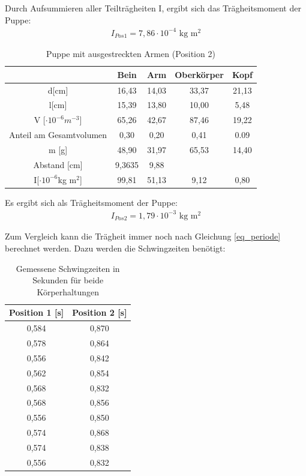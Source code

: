 Durch Aufsummieren aller Teilträgheiten I, ergibt sich das Trägheitsmoment der Puppe:
\begin{align*}
I_{Pos 1}= 7,86
\cdot 10^{-4}\text{ kg m$^2$}
\end{align*}

\begin{table}[H]
\begin{tabular}{|c|c|c|c|c|}
\hline 		
&	Bein&	Arm	&Oberkörper	&Kopf	\\ \hline	
d[cm]&	16,43	&14,03&	33,37&	21,13		\\ \hline		
l[cm]&	15,39&	13,80&	10,00	&5,48\\ \hline
V [$\cdot 10^{-6}m^{-3}$]& 65,26&	42,67	&87,46&	19,22\\ \hline		
Anteil am Gesamtvolumen&	0,30	&0,20&	0,41&	0.09\\ \hline
m [g]&	48,90&	31,97	&65,53&	14,40\\ \hline
Abstand [cm] & 9,3635	&9,88	&&\\ \hline	
I[$\cdot 10^{-6}$kg m$^2$]&99,81	&51,13	&9,12&   0,80
\\ \hline
\end{tabular} 
\caption{Puppe mit ausgestreckten Armen (Position 2)}
\label{tab_pos2}
\end{table}

Es ergibt sich als Trägheitsmoment der Puppe:
\begin{align*}
I_{Pos 2}=1,79\cdot 10^{-3}\text{ kg m$^2$}
\end{align*}

Zum Vergleich kann die Trägheit immer noch nach Gleichung \eqref{eq_periode} berechnet werden. Dazu werden die Schwingzeiten benötigt:
\begin{table}[H]
\begin{tabular}{|c|c|}
\hline 
Position 1 [s] & Position 2 [s]\\ \hline 
0,584&	0,870\\ \hline 
0,578&	0,864\\ \hline 
0,556&	0,842\\ \hline 
0,562&	0,854\\ \hline 
0,568&	0,832\\ \hline 
0,568&	0,856\\ \hline 
0,556&	0,850\\ \hline 
0,574&	0,868\\ \hline 
0,574&	0,838\\ \hline 
0,556&	0,832\\ \hline 
\end{tabular} 
\caption{Gemessene Schwingzeiten in Sekunden für beide Körperhaltungen}
\end{table}

